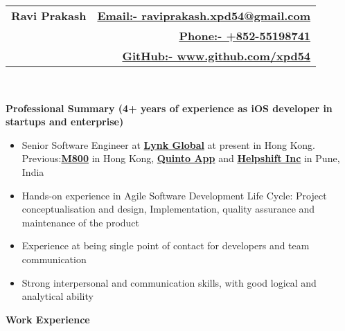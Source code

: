 \documentclass[letterpaper,11pt]{article}
\newcommand{\resitem}[1]{\item #1 \vspace{-2pt}}
\newcommand{\resheading}[1]{{\large \colorbox{mygrey}{\begin{minipage}{\textwidth}{\textbf{#1 \vphantom{p\^{E}}}}\end{minipage}}}}
\begin{document}
\newcommand{\mywebheader}{
\begin{tabular*}{7in}{l@{\extracolsep{\fill}}r}
\textbf{\Huge \bfseries Ravi Prakash} 
& \href{mailto:raviprakash.xpd54@gmail.com}{\normalsize \bfseries Email:- \mdseries raviprakash.xpd54@gmail.com}\\
 & \href{tel:+85255198741}{\normalsize \bfseries Phone:- \mdseries +852-55198741}\\
 & \href{http://www.github.com/xpd54}{\normalsize \bfseries GitHub:- \mdseries www.github.com/xpd54}\\
\end{tabular*}
\\}
\mywebheader

\resheading{\Large Professional Summary \bfseries \normalsize \newline 
(4+ years of experience as iOS developer in startups and enterprise)}
{ \footnotesize
\begin{itemize}
\resitem{Senior Software Engineer at \href{https://lynk.global/en/}{\bfseries Lynk Global} at present in Hong Kong. Previous:\href{https://www.m800.com/}{\bfseries M800} in Hong Kong, \href{http://quintoapp.com}{\bfseries Quinto App} and \href{helpshift.com} {\bfseries  Helpshift Inc} in Pune, India}
\resitem{Hands-on experience in Agile Software Development Life Cycle: Project conceptualisation and design, Implementation,
quality assurance and maintenance of the product}
\resitem{Experience at being single point of contact for developers and team communication}
\resitem{Strong interpersonal and communication skills, with good logical and analytical ability}
\end{itemize}
} %

\resheading{Work Experience}
\end{document}
